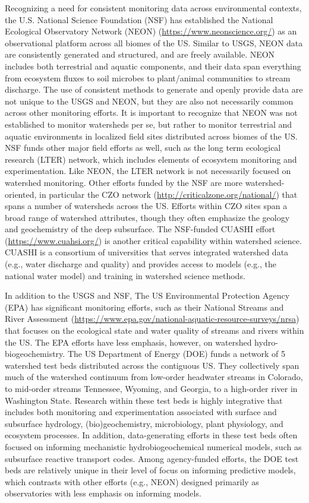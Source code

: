 \documentclass[preprint,review, 12pt]{elsarticle}
\begin{document}
\begin{sloppypar}
Recognizing a need for consistent monitoring data across environmental contexts, the U.S. National Science Foundation (NSF) has established the National Ecological Observatory Network (NEON) (\url{https://www.neonscience.org/}) as an observational platform across all biomes of the US. Similar to USGS, NEON data are consistently generated and structured, and are freely available. NEON includes both terrestrial and aquatic components, and their data span everything from ecosystem fluxes to soil microbes to plant/animal communities to stream discharge. The use of consistent methods to generate and openly provide data are not unique to the USGS and NEON, but they are also not necessarily common across other monitoring efforts. It is important to recognize that NEON was not established to monitor watersheds per se, but rather to monitor terrestrial and aquatic environments in localized field sites distributed across biomes of the US. NSF funds other major field efforts as well, such as the long term ecological research (LTER) network, which includes elements of ecosystem monitoring and experimentation. Like NEON, the LTER network is not necessarily focused on watershed monitoring. Other efforts funded by the NSF are more watershed-oriented, in particular the CZO network (\url{http://criticalzone.org/national/}) that spans a number of watersheds across the US. Efforts within CZO sites span a broad range of watershed attributes, though they often emphasize the geology and geochemistry of the deep subsurface. The NSF-funded CUASHI effort (\url{https://www.cuahsi.org/}) is another critical capability within watershed science. CUASHI is a consortium of universities that serves integrated watershed data (e.g., water discharge and quality) and provides access to models (e.g., the national water model) and training in watershed science methods.

In addition to the USGS and NSF, The US Environmental Protection Agency (EPA) has significant monitoring efforts, such as their National Streams and River Assessment (\url{https://www.epa.gov/national-aquatic-resource-surveys/nrsa}) that focuses on the ecological state and water quality of streams and rivers within the US. The EPA efforts have less emphasis, however, on watershed hydro-biogeochemistry. The US Department of Energy (DOE) funds a network of 5 watershed test beds distributed across the contiguous US. They collectively span much of the watershed continuum from low-order headwater streams in Colorado, to mid-order streams Tennessee, Wyoming, and Georgia, to a high-order river in Washington State. Research within these test beds is highly integrative that includes both monitoring and experimentation associated with surface and subsurface hydrology, (bio)geochemistry, microbiology, plant physiology, and ecosystem processes. In addition, data-generating efforts in these test beds often focused on informing mechanistic hydrobiogeochemical numerical models, such as subsurface reactive transport codes. Among agency-funded efforts, the DOE test beds are relatively unique in their level of focus on informing predictive models, which contrasts with other efforts (e.g., NEON) designed primarily as observatories with less emphasis on informing models. 


\end{sloppypar}
\end{document}
